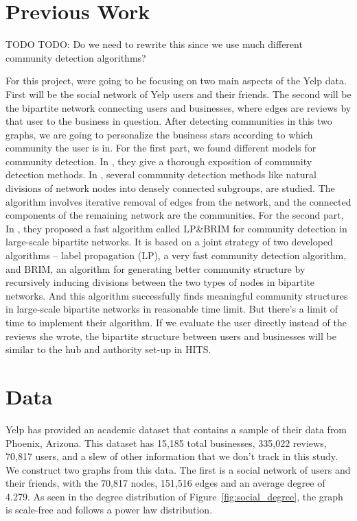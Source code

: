 \documentclass[10pt]{article}
\begin{document}
\section{Previous Work}

TODO
TODO: Do we need to rewrite this since we use much different community detection algorithms?

For this project, were going to be focusing on two main aspects of the Yelp data. First will be
the social network of Yelp users and their friends. The second will be the bipartite network
connecting users and businesses, where edges are reviews by that user to the business
in question. After detecting communities in this two graphs, we are going to personalize
the business stars according to which community the user is in. For the first part, we found different models
for community detection. In \cite{fortunato2010community}, they give a thorough exposition of community detection methods. In \cite{newman2004finding}, several community detection methods like natural divisions of network nodes
into densely connected subgroups, are studied. The algorithm involves iterative removal
of edges from the network, and the connected components of the remaining network are the communities. For the second part, In \cite{liu2009community}, they proposed a fast algorithm called LP\&BRIM for community detection in large-scale bipartite networks. It is based on a joint strategy of two developed algorithms -- label propagation (LP), a very fast community detection algorithm, and BRIM, an algorithm for generating better community structure by recursively inducing divisions between the two types of nodes in bipartite networks. And this algorithm successfully finds meaningful community structures in large-scale bipartite networks in reasonable time limit. But there's a limit of time to implement their algorithm. If we evaluate the user directly instead of the reviews she wrote, the bipartite structure between users and businesses will be similar to the hub and authority set-up in HITS.



\section{Data}

Yelp has provided an academic dataset that contains a sample of their data from Phoenix, Arizona.  This dataset has 15,185 total businesses, 335,022 reviews, 70,817 users, and a slew of other information that we don't track in this study.  We construct two graphs from this data.  The first is a social network of users and their friends, with the 70,817 nodes, 151,516 edges and an average degree of 4.279.  As seen in the degree distribution of Figure~\ref{fig:social_degree}, the graph is scale-free and follows a power law distribution.
\end{document}
